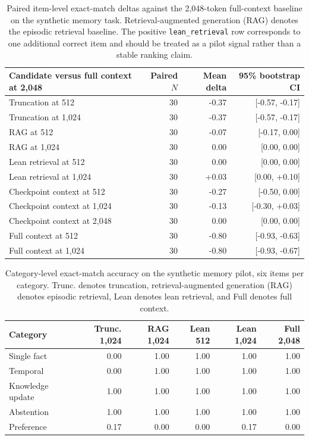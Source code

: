 \documentclass[11pt]{article}
\begin{document}
\begin{table}[t]
\centering
\small
\begin{tabular}{lrrr}
\toprule
Candidate versus full context at 2,048 & Paired $N$ & Mean delta & 95\% bootstrap CI \\
\midrule
Truncation at 512 & 30 & -0.37 & [-0.57, -0.17] \\
Truncation at 1,024 & 30 & -0.37 & [-0.57, -0.17] \\
RAG at 512 & 30 & -0.07 & [-0.17, 0.00] \\
RAG at 1,024 & 30 & 0.00 & [0.00, 0.00] \\
Lean retrieval at 512 & 30 & 0.00 & [0.00, 0.00] \\
Lean retrieval at 1,024 & 30 & +0.03 & [0.00, +0.10] \\
Checkpoint context at 512 & 30 & -0.27 & [-0.50, 0.00] \\
Checkpoint context at 1,024 & 30 & -0.13 & [-0.30, +0.03] \\
Checkpoint context at 2,048 & 30 & 0.00 & [0.00, 0.00] \\
Full context at 512 & 30 & -0.80 & [-0.93, -0.63] \\
Full context at 1,024 & 30 & -0.80 & [-0.93, -0.67] \\
\bottomrule
\end{tabular}
\caption{Paired item-level exact-match deltas against the 2,048-token
full-context baseline on the synthetic memory task.  Retrieval-augmented generation (RAG) denotes the episodic retrieval baseline.  The positive
\texttt{lean\_retrieval} row corresponds to one additional correct item and
should be treated as a pilot signal rather than a stable ranking claim.}
\label{tab:synthetic_memory_deltas}
\end{table}

\begin{table}[t]
\centering
\small
\setlength{\tabcolsep}{3pt}
\begin{tabular}{lrrrrr}
\toprule
Category & Trunc. 1,024 & RAG 1,024 & Lean 512 & Lean 1,024 & Full 2,048 \\
\midrule
Single fact & 0.00 & 1.00 & 1.00 & 1.00 & 1.00 \\
Temporal & 0.00 & 1.00 & 1.00 & 1.00 & 1.00 \\
Knowledge update & 1.00 & 1.00 & 1.00 & 1.00 & 1.00 \\
Abstention & 1.00 & 1.00 & 1.00 & 1.00 & 1.00 \\
Preference & 0.17 & 0.00 & 0.00 & 0.17 & 0.00 \\
\bottomrule
\end{tabular}
\caption{Category-level exact-match accuracy on the synthetic memory pilot,
six items per category.  Trunc. denotes truncation, retrieval-augmented generation (RAG) denotes episodic retrieval, Lean denotes lean retrieval, and Full denotes full context.}
\label{tab:synthetic_memory_categories}
\end{table}
\end{document}
